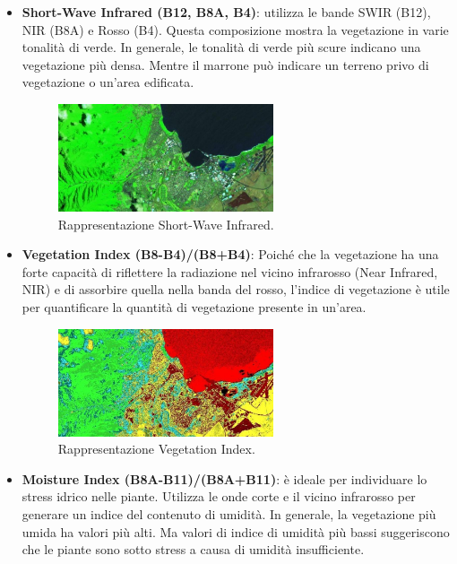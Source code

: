 \begin{itemize}
    \item \textbf{Short-Wave Infrared (B12, B8A, B4)}: utilizza le bande 
    SWIR (B12), NIR (B8A) e Rosso (B4). Questa composizione mostra la vegetazione in 
    varie tonalità di verde. In generale, le tonalità di verde più scure indicano una
    vegetazione più densa. Mentre il marrone può indicare un terreno privo di vegetazione 
    o un'area edificata.
    \begin{figure}[H]
        \centering
        \includegraphics[width=0.6\textwidth]{Immagini/Satelliti/Sentinel-2-Shortwave-Infrared-850x425.jpg}
        \caption{Rappresentazione Short-Wave Infrared.}
    \end{figure}
    
    \newpage
    \item \textbf{Vegetation Index (B8-B4)/(B8+B4)}: Poiché che la 
    vegetazione ha una forte capacità di riflettere la radiazione 
    nel vicino infrarosso (Near Infrared, NIR) e di assorbire quella 
    nella banda del rosso, l'indice di vegetazione è utile per 
    quantificare la quantità di vegetazione presente in un'area. 
    
    \begin{figure}[H]
        \centering
        \includegraphics[width=0.6\textwidth]{Immagini/Satelliti/Sentinel-2-Vegetation-Index-850x425.jpg}
        \caption{Rappresentazione Vegetation Index.}
    \end{figure}
    
    \item \textbf{Moisture Index (B8A-B11)/(B8A+B11)}: è ideale per individuare lo 
    stress idrico nelle piante. Utilizza le onde corte e il vicino infrarosso per 
    generare un indice del contenuto di umidità. In generale, la vegetazione più 
    umida ha valori più alti. Ma valori di indice di umidità più bassi suggeriscono 
    che le piante sono sotto stress a causa di umidità insufficiente.
    

\end{itemize}
